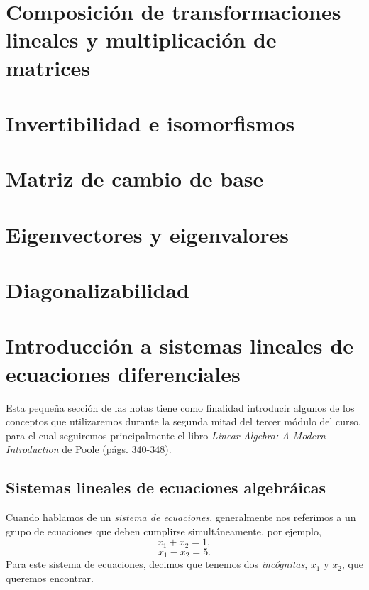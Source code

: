 \documentclass[12pt,dvipsnames]{article}
\begin{document}
\section{Composición de transformaciones lineales y multiplicación de matrices} \label{Sec: Composición de transformaciones lineales y multiplicación de matrices}

\section{Invertibilidad e isomorfismos} \label{Sec:Invertibilidad e isomorfismos}

\section{Matriz de cambio de base} \label{Sec:Matriz de cambio de base}

\section{Eigenvectores y eigenvalores} \label{Sec:Eigenvectores y eigenvalores} 

\section{Diagonalizabilidad} \label{Sec:Diagonalizabilidad} 

\newpage
\section{Introducción a sistemas lineales de ecuaciones diferenciales} \label{Sec: Sistemas lineales de ecuaciones diferenciales ordinarias} 

Esta pequeña sección de las notas tiene como finalidad introducir algunos de los conceptos que utilizaremos durante la segunda mitad del tercer módulo del curso, para el cual seguiremos principalmente el libro \emph{Linear Algebra: A Modern Introduction} de Poole (págs. 340-348).

\subsection{Sistemas lineales de ecuaciones algebráicas}

Cuando hablamos de un \emph{sistema de ecuaciones}, generalmente nos referimos a un grupo de ecuaciones que deben cumplirse simultáneamente, por ejemplo, $$x_1 + x_2 = 1,$$ $$x_1 - x_2 = 5.$$ Para este sistema de ecuaciones, decimos que tenemos dos \emph{incógnitas}, $x_1$ y $x_2$, que queremos encontrar.
\end{document}
